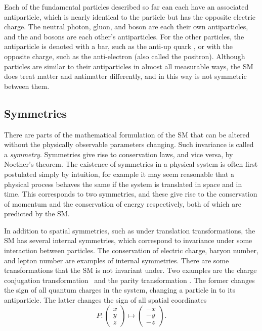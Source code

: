Each of the fundamental particles described so far can each have an associated 
antiparticle, which is nearly identical to the particle but has the opposite 
electric charge.
The neutral photon, gluon, and \PZ boson are each their own antiparticles, and 
the \PWp and \PWm bosons are each other's antiparticles.
For the other particles, the antiparticle is denoted with a bar, such as the 
anti-up quark \APup, or with the opposite charge, such as the anti-electron 
\APelectron (also called the positron).
Although particles are similar to their antiparticles in almost all measurable 
ways, the \ac{SM} does treat matter and antimatter differently, and in this way 
is not symmetric between them.

\subsection{Symmetries}

There are parts of the mathematical formulation of the \ac{SM} that can be 
altered without the physically observable parameters changing.
Such invariance is called a \emph{symmetry}.
Symmetries give rise to conservation laws, and vice versa, by Noether's 
theorem.
The existence of symmetries in a physical system is often first postulated 
simply by intuition, for example it may seem reasonable that a physical process 
behaves the same if the system is translated in space and in time.
This corresponds to two symmetries, and these give rise to the conservation of 
momentum and the conservation of energy respectively, both of which are 
predicted by the \ac{SM}.

In addition to spatial symmetries, such as under translation transformations, 
the \ac{SM} has several internal symmetries, which correspond to invariance 
under some interaction between particles.
The conservation of electric charge, baryon number, and lepton number are 
examples of internal symmetries.
There are some transformations that the \ac{SM} is not invariant under.
Two examples are the charge conjugation transformation \Ctransform\ and the 
parity transformation \Ptransform.
The former changes the sign of all quantum charges in the system, changing a 
particle in to its antiparticle.
The latter changes the sign of all spatial coordinates
\begin{equation}
  P: \begin{pmatrix}x\\y\\z\end{pmatrix}
     \mapsto \begin{pmatrix}-x\\-y\\-z\end{pmatrix}.
  \label{eqn:intro:sm:parity}
\end{equation}

